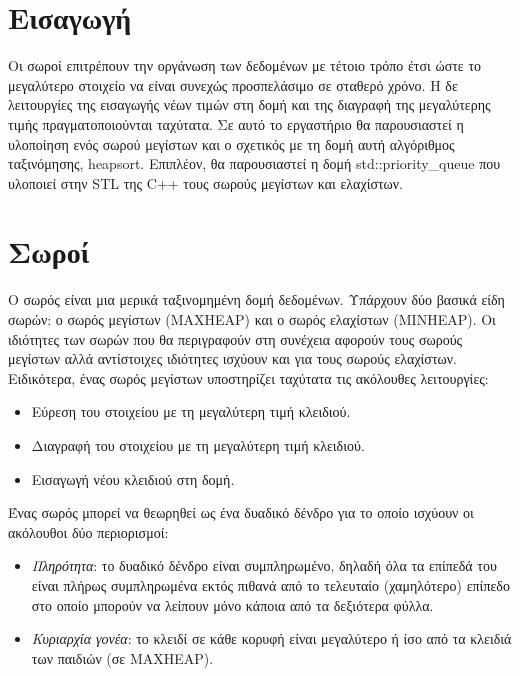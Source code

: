 \section{Εισαγωγή}
Οι σωροί επιτρέπουν την οργάνωση των δεδομένων με τέτοιο τρόπο έτσι ώστε το μεγαλύτερο στοιχείο να είναι συνεχώς προσπελάσιμο σε σταθερό χρόνο. Η δε λειτουργίες της εισαγωγής νέων τιμών στη δομή και της διαγραφή της μεγαλύτερης τιμής πραγματοποιούνται ταχύτατα. Σε αυτό το εργαστήριο θα παρουσιαστεί η υλοποίηση ενός σωρού μεγίστων και ο σχετικός με τη δομή αυτή αλγόριθμος ταξινόμησης, heapsort. Επιπλέον, θα παρουσιαστεί η δομή std::priority\_queue που υλοποιεί στην STL της C++ τους σωρούς μεγίστων και ελαχίστων.

\section{Σωροί}
Ο σωρός είναι μια μερικά ταξινομημένη δομή δεδομένων. Υπάρχουν δύο βασικά είδη σωρών: ο σωρός μεγίστων (MAXHEAP) και ο σωρός ελαχίστων (MINHEAP). Οι ιδιότητες των σωρών που θα περιγραφούν στη συνέχεια αφορούν τους σωρούς μεγίστων αλλά αντίστοιχες ιδιότητες ισχύουν και για τους σωρούς ελαχίστων. Ειδικότερα, ένας σωρός μεγίστων υποστηρίζει ταχύτατα τις ακόλουθες λειτουργίες:
\begin{itemize}[noitemsep]
\item Εύρεση του στοιχείου με τη μεγαλύτερη τιμή κλειδιού.
\item Διαγραφή του στοιχείου με τη μεγαλύτερη τιμή κλειδιού.
\item Εισαγωγή νέου κλειδιού στη δομή.
\end{itemize}

Ένας σωρός μπορεί να θεωρηθεί ως ένα δυαδικό δένδρο για το οποίο ισχύουν οι ακόλουθοι δύο περιορισμοί:
\begin{itemize}[noitemsep]
\item	{\em Πληρότητα}: το δυαδικό δένδρο είναι συμπληρωμένο, δηλαδή όλα τα επίπεδά του είναι πλήρως συμπληρωμένα εκτός πιθανά από το τελευταίο (χαμηλότερο) επίπεδο στο οποίο μπορούν να λείπουν μόνο κάποια από τα δεξιότερα φύλλα.
\item	{\em Κυριαρχία γονέα}: το κλειδί σε κάθε κορυφή είναι μεγαλύτερο ή ίσο από τα κλειδιά των παιδιών (σε MAXHEAP).
\end{itemize}

